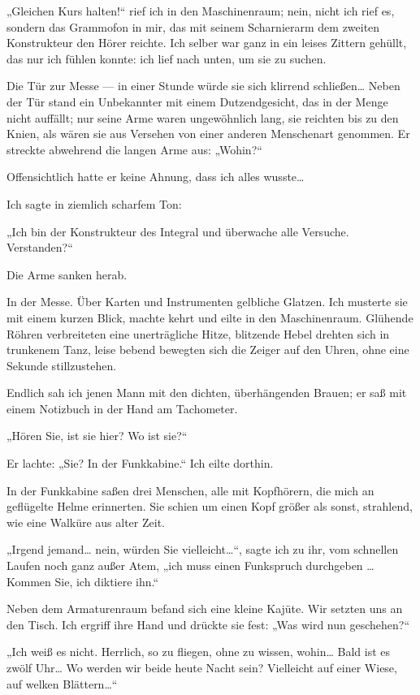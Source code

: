 „Gleichen Kurs halten!“ rief ich in den Maschinenraum; nein, nicht
ich rief es, sondern das Grammofon in mir, das mit seinem
Scharnierarm dem zweiten Konstrukteur den Hörer reichte. Ich selber
war ganz in ein leises Zittern gehüllt, das nur ich fühlen konnte:
ich lief nach unten, um sie zu suchen.

Die Tür zur Messe — in einer Stunde würde sie sich klirrend
schließen\ldots{} Neben der Tür stand ein Unbekannter mit einem
Dutzendgesicht, das in der Menge nicht auffällt; nur seine Arme
waren ungewöhnlich lang, sie reichten bis zu den Knien, als wären
sie aus Versehen von einer anderen Menschenart genommen. Er
streckte abwehrend die langen Arme aus:
„Wohin?“

Offensichtlich hatte er keine Ahnung, dass ich alles wusste\ldots{}

Ich sagte in ziemlich scharfem Ton:

„Ich bin der Konstrukteur des Integral und überwache alle Versuche.
Verstanden?“

Die Arme sanken herab.

In der Messe. Über Karten und Instrumenten gelbliche Glatzen. Ich
musterte sie mit einem kurzen Blick, machte kehrt und eilte in den
Maschinenraum. Glühende Röhren verbreiteten eine unerträgliche
Hitze, blitzende Hebel drehten sich in trunkenem Tanz, leise bebend
bewegten
sich die Zeiger auf den Uhren, ohne eine Sekunde stillzustehen.

Endlich sah ich jenen Mann mit den dichten, überhängenden Brauen;
er saß mit einem Notizbuch in der Hand am Tachometer.

„Hören Sie, ist sie hier? Wo ist sie?“

Er lachte: „Sie? In der Funkkabine.“ Ich eilte dorthin.

In der Funkkabine saßen drei Menschen, alle mit Kopfhörern, die
mich an geflügelte Helme erinnerten. Sie schien um einen Kopf
größer als sonst, strahlend, wie eine Walküre aus alter Zeit.

„Irgend jemand\ldots{} nein, würden Sie vielleicht\ldots{}“, sagte ich zu
ihr, vom schnellen Laufen noch ganz außer Atem, „ich muss einen
Funkspruch durchgeben \ldots{} Kommen Sie, ich diktiere ihn.“

Neben dem Armaturenraum befand sich eine kleine Kajüte. Wir setzten
uns an den Tisch. Ich ergriff ihre Hand und drückte sie fest: „Was
wird nun geschehen?“

„Ich weiß es nicht. Herrlich, so zu fliegen, ohne zu wissen,
wohin\ldots{} Bald ist es zwölf Uhr\ldots{} Wo werden wir beide heute Nacht
sein? Vielleicht auf einer Wiese, auf welken Blättern\ldots{}“

